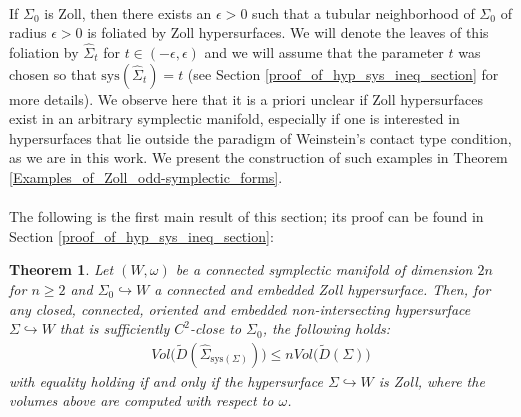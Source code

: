 \documentclass[11pt]{amsart}
\theoremstyle{plain}
\newtheorem{theorem}{Theorem}[section]
\theoremstyle{definition}
\theoremstyle{remark}
\begin{document}
\\
If $\Sigma_0$ is Zoll, then there exists an $\epsilon>0$ such that a tubular neighborhood of $\Sigma_0$ of radius $\epsilon>0$ is foliated by Zoll hypersurfaces. We will denote the leaves of this foliation by $\hat{\Sigma}_t$ for $t \in (-\epsilon,\epsilon)$ and we will assume that the parameter $t$ was chosen so that $\text{sys}(\hat{\Sigma}_t) = t$ (see Section \ref{proof_of_hyp_sys_ineq_section} for more details). We observe here that it is a priori unclear if Zoll hypersurfaces exist in an arbitrary symplectic manifold, especially if one is interested in hypersurfaces that lie outside the paradigm of Weinstein's contact type condition, as we are in this work. We present the construction of such examples in Theorem \ref{Examples_of_Zoll_odd-symplectic_forms}.\\
\\
The following is the first main result of this section; its proof can be found in Section \ref{proof_of_hyp_sys_ineq_section}:
\begin{theorem}\label{systolic_ineq_for_hyp_sur}
    Let $(W,\omega)$ be a connected symplectic manifold of dimension $2n$ for $n\geq 2$ and $\Sigma_0 \hookrightarrow W$ a connected and embedded Zoll hypersurface. Then, for any closed, connected, oriented and embedded non-intersecting hypersurface $\Sigma \hookrightarrow W$ that is sufficiently $C^2$-close to $\Sigma_0$, the following holds:
    \begin{align}
        Vol\big(\tilde D(\hat{\Sigma}_{\text{sys}(\Sigma)})\big)\leq nVol\big(\tilde D(\Sigma)\big)
    \end{align}
    with equality holding if and only if the hypersurface $\Sigma \hookrightarrow W$ is Zoll, where the volumes above are computed with respect to $\omega$.
\end{theorem}
\end{document}
